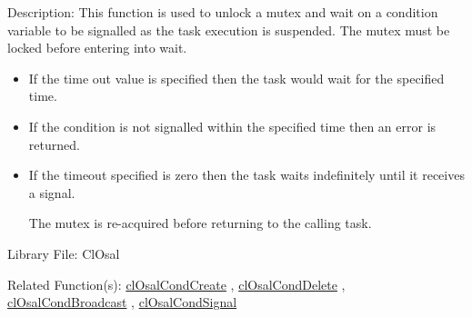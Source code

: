 \begin{Desc}
\item[Description:]This function is used to unlock a mutex and wait on a condition variable to be signalled as the task execution is suspended. The mutex must be locked before entering into wait. \begin{itemize}
\item If the time out value is specified then the task would wait for the specified time. \item If the condition is not signalled within the specified time then an error is returned. \item If the timeout specified is zero then the task waits indefinitely until it receives a signal. \par
 \par
 The mutex is re-acquired before returning to the calling task.\end{itemize}
\end{Desc}
\begin{Desc}
\item[Library File:]Cl\-Osal\end{Desc}
\begin{Desc}
\item[Related Function(s):]\hyperlink{pageosal118}{cl\-Osal\-Cond\-Create} , \hyperlink{pageosal119}{cl\-Osal\-Cond\-Delete} , 
\hyperlink{pageosal121}{cl\-Osal\-Cond\-Broadcast} , \hyperlink{pageosal122}{cl\-Osal\-Cond\-Signal} \end{Desc}

\newpage
